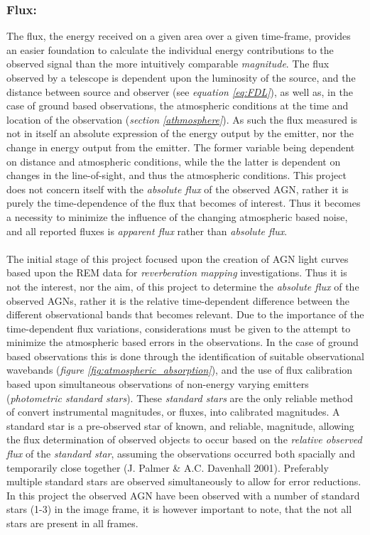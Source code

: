 \documentclass[a4paper, 12pt, twoside]{article}
\begin{document}
\subsubsection{Flux:}
The flux, the energy received on a given area over a given time-frame, provides an easier foundation to calculate the individual energy contributions to the observed signal than the more intuitively comparable \emph{magnitude}. The flux observed by a telescope is dependent upon the luminosity of the source, and the distance between source and observer (see \emph{equation \ref{eq:FDL}}), as well as, in the case of ground based observations, the atmospheric conditions at the time and location of the observation (\emph{section \ref{athmosphere}}). As such the flux measured is not in itself an absolute expression of the energy output by the emitter, nor the change in energy output from the emitter. The former variable being dependent on distance and atmospheric conditions, while the the latter is dependent on changes in the line-of-sight, and thus the atmospheric conditions. This project does not concern itself with the \emph{absolute flux} of the observed AGN, rather it is purely the time-dependence of the flux that becomes of interest. Thus it becomes a necessity to minimize the influence of the changing atmospheric based noise, and all reported fluxes is \emph{apparent flux} rather than \emph{absolute flux}. \\
\\
The initial stage of this project focused upon the creation of AGN light curves based upon the REM data for \emph{reverberation mapping} investigations. Thus it is not the interest, nor the aim, of this project to determine the \emph{absolute flux} of the observed AGNs, rather it is the relative time-dependent difference between the different observational bands that becomes relevant. Due to the importance of the time-dependent flux variations, considerations must be given to the attempt to minimize the atmospheric based errors in the observations. In the case of ground based observations this is done through the identification of suitable observational wavebands (\emph{figure \ref{fig:atmospheric_absorption}}), and the use of flux calibration based upon simultaneous observations of non-energy varying emitters (\emph{photometric standard stars}). These \emph{standard stars} are the only reliable method of convert instrumental magnitudes, or fluxes, into calibrated magnitudes. A standard star is a pre-observed star of known, and reliable, magnitude, allowing the flux determination of observed objects to occur based on the \emph{relative observed flux} of the \emph{standard star}, assuming the observations occurred both spacially and temporarily close together (J. Palmer \& A.C. Davenhall 2001\cite{CCD:COOK}). Preferably multiple standard stars are observed simultaneously to allow for error reductions. In this project the observed AGN have been observed with a number of standard stars (1-3) in the image frame, it is however important to note, that the not all stars are present in all frames. \\
\end{document}
